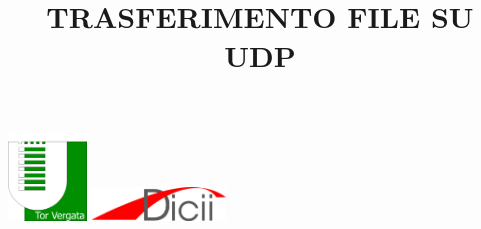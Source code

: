\documentclass[12pt]{article}
\title{\uppercase{Trasferimento file su UDP}}
\begin{document}
\includegraphics[width=2.1cm, valign=t]{image1}
\hfill
\includegraphics[width=3.55cm, valign=t]{image2}
{\let\newpage\relax\maketitle}
\tableofcontents








\end{document}
